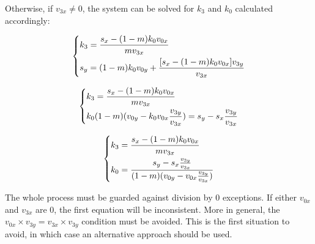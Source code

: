 \documentclass{scrartcl}
\begin{document}
Otherwise, if $v_{3x} \ne 0$, the system can be solved for $k_3$ and $k_0$
calculated accordingly:

\begin{equation*}
\begin{dcases}
    k_3 = \frac{s_x - (1-m) k_0 v_{0x}}{m v_{3x}} \\
    s_y = (1-m) k_0 v_{0y} + \frac{[s_x - (1-m) k_0 v_{0x}] v_{3y}}{v_{3x}} \\
\end{dcases}
\end{equation*}

\begin{equation*}
\begin{dcases}
    k_3 = \frac{s_x - (1-m) k_0 v_{0x}}{m v_{3x}} \\
    k_0 (1-m) (v_{0y} - k_0 v_{0x} \frac{v_{3y}}{v_{3x}}) = s_y - s_x \frac{v_{3y}}{v_{3x}} \\
\end{dcases}
\end{equation*}

\begin{equation*}
\begin{dcases}
    k_3 = \frac{s_x - (1-m) k_0 v_{0x}}{m v_{3x}} \\
    k_0 = \frac{s_y - s_x \frac{v_{3y}}{v_{3x}}}{(1-m) (v_{0y} - v_{0x} \frac{v_{3y}}{v_{3x}})} \\
\end{dcases}
\end{equation*}

The whole process must be guarded against division by 0 exceptions.
If either $v_{0x}$ and $v_{3x}$ are 0, the first equation will be
inconsistent. More in general, the
$v_{0x} \times v_{3y} = v_{3x} \times v_{3y}$ condition must be avoided. This is
the first situation to avoid, in which case an alternative approach
should be used.
\end{document}
